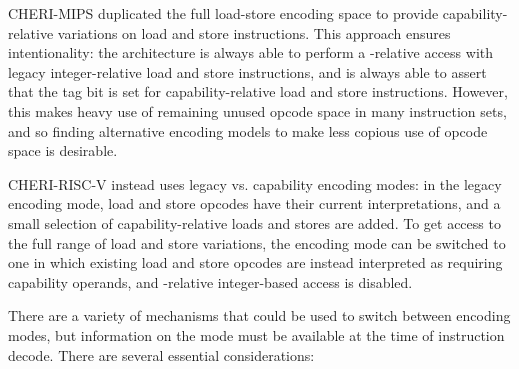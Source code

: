 CHERI-MIPS duplicated the full load-store encoding
space to provide capability-relative variations on load and store
instructions.
This approach ensures intentionality: the architecture is always able to
perform a \DDC{}-relative access with legacy integer-relative load and store
instructions, and is always able to assert that the tag bit is set for
capability-relative load and store instructions.
However, this makes heavy use of remaining unused opcode space in many
instruction sets, and so finding alternative encoding models to make less
copious use of opcode space is desirable.

CHERI-RISC-V instead uses legacy vs.
capability encoding modes: in the legacy encoding mode, load and store opcodes
have their current interpretations, and a small selection of
capability-relative loads and stores are added.
To get access to the full range of load and store variations, the encoding
mode can be switched to one in which existing load and store opcodes are
instead interpreted as requiring capability operands, and \DDC{}-relative
integer-based access is disabled.

There are a variety of mechanisms that could be used to switch between
encoding modes, but information on the mode must be available at the time
of instruction decode.
There are several essential considerations:

